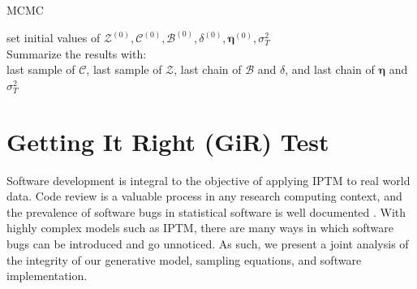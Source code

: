  \begin{algorithm}[H]
 	\SetAlgoLined
 	\caption{MCMC}
 	set initial values of $\mathcal{Z}^{(0)}, \mathcal{C}^{(0)}, \mathcal{B}^{(0)}, \delta^{(0)}, \boldsymbol{\eta}^{(0)}, \sigma_T^2$\\
 	Summarize the results with: \\
 	last sample of $\mathcal{C}$, last sample of $\mathcal{Z}$, last chain of $\mathcal{B}$ and $\delta$, and last chain of $\boldsymbol{\eta}$ and $\sigma_T^2$ 
 \end{algorithm}
 
   \section{Getting It Right (GiR) Test}
   Software development is integral to the objective of applying IPTM to real world data. Code review is a valuable process in any research computing context, and the prevalence of software bugs in statistical software is well documented \citep[e.g., ][]{altman2004numerical,mccullough2009accuracy}.  With highly complex models such as IPTM, there are many ways in which software bugs can be introduced and go unnoticed. As such, we present a joint analysis of the integrity of our generative model, sampling equations, and software implementation. 
 
